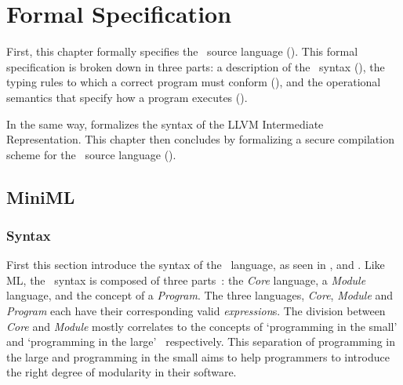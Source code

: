 \chapter{Formal Specification}
\label{chap:formalspecification}
First, this chapter formally specifies the \MiniML\ source language ().
This formal specification is broken down in three parts:
a description of the \MiniML\ syntax (),
the typing rules to which a correct program must conform (),
and the operational semantics that specify how a program executes ().

In the same way,  formalizes the syntax of the LLVM Intermediate Representation.
This chapter then concludes by formalizing a secure compilation scheme for the \MiniML\ source language ().


\section{MiniML}
\label{sec:MiniMLFormalSpecification}
\subsection{Syntax}
\label{sec:ch2syntax}
First this section introduce the syntax of the \MiniML\ language, as seen in ,  and .
Like ML, the \MiniML\ syntax is composed of three parts~\cite{Milner:1997:DSM:549659}: the \emph{Core} language, a \emph{Module} language, and the concept of a \emph{Program}. 
The three languages, \emph{Core}, \emph{Module} and \emph{Program} each have their corresponding valid \emph{expression}s.
The division between \emph{Core} and \emph{Module} mostly correlates to the concepts of `programming in the small' and `programming in the large'~\cite{Milner:1997:DSM:549659,DeRemer:1975:PLV:390016.808431} respectively.
This separation of programming in the large and programming in the small aims to help programmers to introduce the right degree of modularity in their software.

